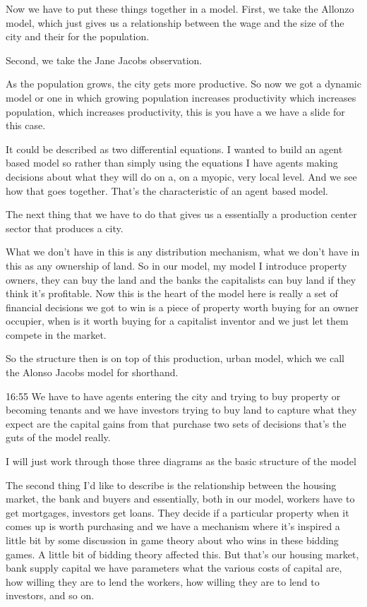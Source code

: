 \documentclass[]{article}
\begin{document}

Now we have to put these things together in a model.
First, we take the Allonzo model, which just gives us a relationship between the wage and the size of the city and their for the population.

Second, we take the Jane Jacobs observation.

As the population grows, the city gets more productive. So now we got a dynamic model or one in which growing population increases productivity which increases population, which increases productivity, this is you have a we have a slide for this case.

It could be described as two differential equations. I wanted to build an agent based model so rather than simply using the equations I have agents making decisions about what they will do on a, on a myopic, very local level. And we see how that goes together. That's the characteristic of an agent based model.

The next thing that we have to do that gives us a essentially a production center sector that produces a city.

What we don't have in this is any distribution mechanism, what we don't have in this as any ownership of land. So in our model, my model I introduce property owners, they can buy the land and the banks the capitalists can buy land if they think it's profitable. Now this is the heart of the model here is really a set of financial decisions we got to win is a piece of property worth buying for an owner occupier, when is it worth buying for a capitalist inventor and we just let them compete in the market.

So the structure then is on top of this production, urban model, which we call the Alonso Jacobs model for shorthand.

16:55
We have to have agents entering the city and trying to buy property or becoming tenants and we have investors trying to buy land to capture what they expect are the capital gains from that purchase two sets of decisions that's the guts of the model really.

I will just work through those three diagrams as the basic structure of the model



The second thing I'd like to describe is the relationship between
the housing market, the bank and buyers and essentially, both in our model, workers have to get mortgages, investors get loans. They decide if a particular property when it comes up is worth purchasing and we have a mechanism where it's inspired a little bit by some discussion in game theory about who wins in these bidding games. A little bit of bidding theory affected this. But that's our housing market, bank supply capital we have parameters what the various costs of capital are, how willing they are to lend the workers, how willing they are to lend to investors, and so on.
\end{document}
